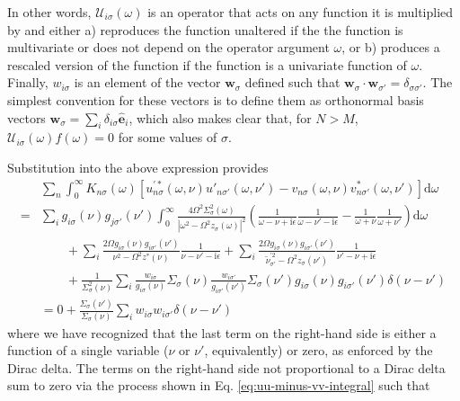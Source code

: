 In other words, $\mathcal{U}_{i\sigma}(\omega)$ is an operator that acts on any function it is multiplied by and either a) reproduces the function unaltered if the the function is multivariate or does not depend on the operator argument $\omega$, or b) produces a rescaled version of the function if the function is a univariate function of $\omega$. Finally, $w_{i\sigma}$ is an element of the vector $\mathbf{w}_\sigma$ defined such that $\mathbf{w}_\sigma\cdot\mathbf{w}_{\sigma'} = \delta_{\sigma\sigma'}$. The simplest convention for these vectors is to define them as orthonormal basis vectors $\mathbf{w}_\sigma = \sum_i\delta_{i\sigma}\hat{\mathbf{e}}_i$, which also makes clear that, for $N>M$, $\mathcal{U}_{i\sigma}(\omega)f(\omega) = 0$ for some values of $\sigma$.

Substitution into the above expression provides
\begin{equation}
\begin{split}
&\sum_n\int_0^\infty K_{n\sigma}(\omega)\left[u_{n\sigma}^{\prime*}(\omega,\nu)u'_{n\sigma'}(\omega,\nu') - v_{n\sigma}(\omega,\nu)v_{n\sigma'}^*(\omega,\nu')\right]\mathrm{d}\omega\\
= &\sum_ig_{i\sigma}(\nu)g_{j\sigma'}(\nu')\int_0^\infty\frac{4\Omega^2\Sigma_\sigma^2(\omega)}{|\omega^2 - \Omega^2z_\sigma(\omega)|^2}\left(\frac{1}{\omega - \nu  + \mathrm{i}\epsilon}\frac{1}{\omega - \nu' - \mathrm{i}\epsilon} - \frac{1}{\omega + \nu }\frac{1}{\omega + \nu'}\right)\mathrm{d}\omega\\
&\qquad + \sum_i\frac{2\Omega g_{i\sigma}(\nu)g_{i\sigma'}(\nu')}{\nu ^2 - \Omega^2z^*(\nu )}\frac{1}{\nu  - \nu' - \mathrm{i}\epsilon} + \sum_i\frac{2\Omega g_{i\sigma}(\nu)g_{i\sigma'}(\nu')}{\tilde{\nu}^{\prime2}_{\sigma'} - \Omega^2z_\sigma(\nu')}\frac{1}{\nu' - \nu  + \mathrm{i}\epsilon}\\
&\qquad + \frac{1}{\Sigma_\sigma^2(\nu )}\sum_i\frac{w_{i\sigma}}{g_{i\sigma}(\nu)}\Sigma_\sigma(\nu )\frac{w_{i\sigma'}}{g_{i\sigma'}(\nu')}\Sigma_\sigma(\nu')g_{i\sigma}(\nu)g_{i\sigma'}(\nu')\delta(\nu  - \nu')\\
&= 0 + \frac{\Sigma_\sigma(\nu')}{\Sigma_\sigma(\nu )}\sum_iw_{i\sigma}w_{i\sigma'}\delta(\nu  - \nu')
\end{split}
\end{equation}
where we have recognized that the last term on the right-hand side is either a function of a single variable ($\nu$ or $\nu'$, equivalently) or zero, as enforced by the Dirac delta. The terms on the right-hand side not proportional to a Dirac delta sum to zero via the process shown in Eq. \eqref{eq:uu-minus-vv-integral} such that
